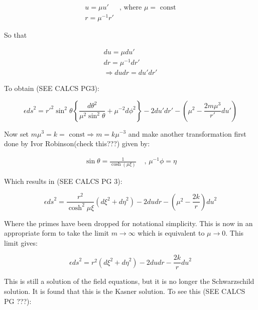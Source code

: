 \begin{eqnarray*} 
u = \mu u'        & \text{, where }  \mu = \text{ const}\\
r = {\mu}^{-1} r' & 
\end{eqnarray*} 

\noindent So that
  
\begin{eqnarray*} 
du = \mu du' \\
dr = {\mu}^{-1} dr' \\
\Rightarrow du dr = du' dr'
\end{eqnarray*} 

\noindent To obtain (SEE CALCS PG3):

\begin{equation*}
\epsilon {ds}^2 = {r'}^2 \sin^2 \theta \left\{ \frac{{d\theta}^2}{\mu^2 \sin^2 \theta} +  \mu^{-2} {d \phi}^2 \right\} - 2 {du'} {dr'} - \left( \mu^2 - \frac{2 m \mu^3}{r'} {du'} \right) 
\end{equation*}

\noindent Now set $m \mu^{3} = k = \text{ const} \Rightarrow m = k \mu^{-3}$ and make another transformation first done by Ivor Robinson(check this???) given by:

\begin{eqnarray} 
\sin{\theta} = \frac{1}{\cosh{(\mu \xi)}} & \text{   ,    } \mu^{-1} \phi = \eta  
\end{eqnarray} 

\noindent Which results in (SEE CALCS PG 3): 

\begin{equation*}
\epsilon {ds}^2 = \frac{r^2}{\cosh^{2}{\mu \xi}} ({d\xi}^2 + {d\eta}^2) - 2 {du}{dr} - \left( \mu^{2} - \frac{2k}{r} \right) {du}^2
\end{equation*}

\noindent Where the primes have been dropped for notational simplicity. This is now in an appropriate form to take the limit $m \rightarrow \infty$ which is equivalent to $\mu \rightarrow 0$. This limit gives:

\begin{equation}\label{Kasner_after_limit}
\epsilon {ds}^2 = r^2 ({d\xi}^2 + {d\eta}^2) - 2 {du}{dr} - \frac{2k}{r} {du}^2
\end{equation}

\noindent This is still a solution of the field equations, but it is no longer the Schwarzschild solution. It is found that this is the Kasner solution. To see this (SEE CALCS PG ???):

